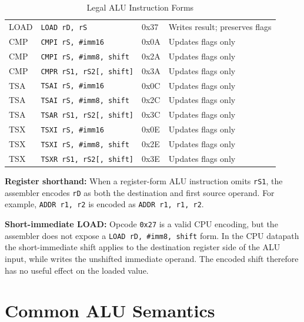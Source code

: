\begin{table}[H]
\begin{tabular}{llll}
		LOAD & \texttt{LOAD rD, rS} & 0x37 & Writes result; preserves flags \\
		CMP  & \texttt{CMPI rS, \#imm16} & 0x0A & Updates flags only \\
		CMP  & \texttt{CMPI rS, \#imm8, shift} & 0x2A & Updates flags only \\
		CMP  & \texttt{CMPR rS1, rS2[, shift]} & 0x3A & Updates flags only \\
		TSA  & \texttt{TSAI rS, \#imm16} & 0x0C & Updates flags only \\
		TSA  & \texttt{TSAI rS, \#imm8, shift} & 0x2C & Updates flags only \\
		TSA  & \texttt{TSAR rS1, rS2[, shift]} & 0x3C & Updates flags only \\
		TSX  & \texttt{TSXI rS, \#imm16} & 0x0E & Updates flags only \\
		TSX  & \texttt{TSXI rS, \#imm8, shift} & 0x2E & Updates flags only \\
		TSX  & \texttt{TSXR rS1, rS2[, shift]} & 0x3E & Updates flags only \\
		\bottomrule
	\end{tabular}
	\caption{Legal ALU Instruction Forms}
	\label{tab:alu-legal-forms}
\end{table}

\noindent\textbf{Register shorthand:} When a register-form ALU instruction omits \texttt{rS1}, the assembler encodes
\texttt{rD} as both the destination and first source operand. For example, \texttt{ADDR r1, r2} is encoded as
\texttt{ADDR r1, r1, r2}.

\noindent\textbf{Short-immediate LOAD:} Opcode \texttt{0x27} is a valid CPU encoding, but the assembler does not expose a
\texttt{LOAD rD, \#imm8, shift} form. In the CPU datapath the short-immediate shift applies to the destination register
side of the ALU input, while  writes the unshifted immediate operand. The encoded shift therefore has no
useful effect on the loaded value.

\section{Common ALU Semantics}

